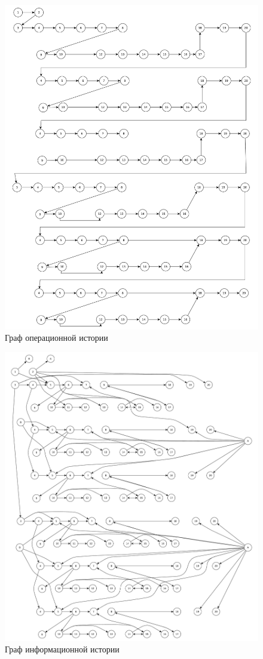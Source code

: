 \begin{figure}[ht!]
	\centering
	\includegraphics[width=1\linewidth]{assets/graphs/history_operation.pdf}
	\captionsetup{singlelinecheck = false, justification=centerfirst}
	\caption{Граф операционной истории}
	\label{oper-2}
\end{figure}
\begin{figure}[ht!]
	\centering
	\includegraphics[width=1\linewidth]{assets/graphs/history_information.pdf}
	\captionsetup{singlelinecheck = false, justification=centerfirst}
	\caption{Граф информационной истории}
	\label{info-2}
\end{figure}